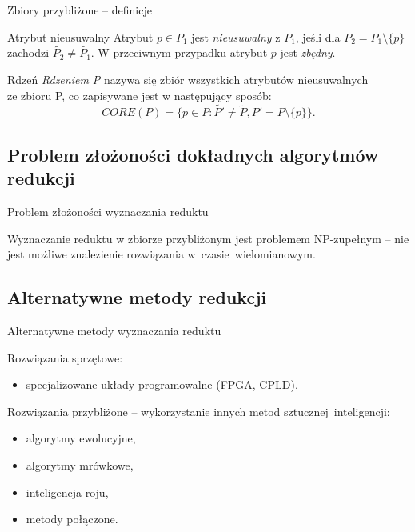 \documentclass[10pt]{beamer}
\begin{document}
\begin{frame}{Zbiory przybliżone -- definicje}
\begin{spacing}{1.3}

\begin{block}{Atrybut nieusuwalny}
Atrybut $p\in P_{1}$ jest \textit{nieusuwalny} z $P_{1}$, jeśli dla $P_{2} = P_{1}\setminus\lbrace p\rbrace$ zachodzi $\widetilde{P_{2}} \neq \widetilde{P_{1}}$. W przeciwnym przypadku atrybut $p$ jest \textit{zbędny}.
\end{block}

\begin{block}{Rdzeń}
\textit{Rdzeniem P} nazywa się zbiór wszystkich atrybutów nieusuwalnych\\
ze zbioru P, co zapisywane jest w następujący sposób:
$$CORE(P) = \lbrace p \in P : \widetilde{P'} \neq \widetilde{P}, P'=P\setminus \lbrace p \rbrace\rbrace.$$
\end{block}

\end{spacing}
\end{frame}


\subsection{Problem złożoności dokładnych algorytmów redukcji}
\begin{frame}{Problem złożoności wyznaczania reduktu}
\begin{spacing}{1.5}
Wyznaczanie reduktu w zbiorze przybliżonym jest problemem NP-zupełnym -- nie jest możliwe znalezienie rozwiązania w~czasie~wielomianowym.
\end{spacing}
\end{frame}

\subsection{Alternatywne metody redukcji}
\begin{frame}{Alternatywne metody wyznaczania reduktu}
\begin{spacing}{1.5}
Rozwiązania sprzętowe:\\
\begin{itemize}
\item specjalizowane układy programowalne (FPGA, CPLD).
\end{itemize}

Rozwiązania przybliżone -- wykorzystanie innych metod sztucznej~inteligencji:\\
\begin{itemize}
\item \alert{algorytmy ewolucyjne},
\item algorytmy mrówkowe,
\item inteligencja roju,
\item metody połączone.
\end{itemize}
\end{spacing}
\end{frame}
\end{document}
